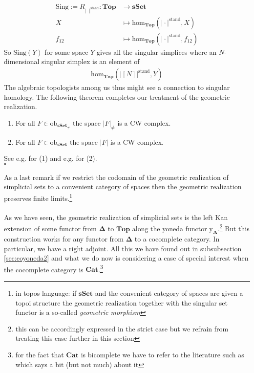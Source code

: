\begin{align*}
  \mathrm{Sing}
  :=
  R_{\vert \cdot \vert^{\textrm{stand}}}
  \colon
  \mathbf{Top}
  &\rightarrow
  \mathbf{sSet}
  \\
  X
  &\mapsto
  \mathrm{hom}_{\mathbf{Top}}
  \left(
    \vert
      \cdot
    \vert^{\textrm{stand}},
    X
  \right)
  \\
  f_{12}
  &\mapsto
  \mathrm{hom}_{\mathbf{Top}}
  \left(
    \vert
      \cdot
    \vert^{\textrm{stand}},
    f_{12}
  \right)
\end{align*}
So $\mathrm{Sing}(Y)$ for some space $Y$ gives all the singular simplices where an $N$-dimensional singular simplex is an element of
\begin{align*}
  \mathrm{hom}_{\mathbf{Top}}
  \left(
    \left\vert
      [N]
    \right\vert^{\textrm{stand}},
    Y
  \right)
\end{align*}
The algebraic topologists among us thus might see a connection to singular homology. The following theorem completes our treatment of the geometric realization.
\\
\begin{thm}
\label{thm:ssetcwcompex}
\begin{enumerate}
\item[(1)]
For all $F \in \mathrm{ob}_{\mathbf{sSet}_{\neq}}$ the space $\vert F \vert_{\neq}$ is a CW complex.
\item[(2)]
For all $F \in \mathrm{ob}_{\mathbf{sSet}}$ the space $\vert F \vert$ is a CW complex.
\end{enumerate}
\end{thm}
\begin{prf}
See e.g. \cite{8b5861fc} for (1) and e.g. \cite{b28b8d8f} for (2).
\\
\phantom{proven}
\hfill
$\square$
\end{prf}
As a last remark if we restrict the codomain of the geometric realization of simplicial sets to a convenient category of spaces then the geometric realization preserves finite limits.\footnote{in topos language: if $\mathbf{sSet}$ and the convenient category of spaces are given a topoi structure the geometric realization together with the singular set functor is a so-called \textit{geometric morphism}}
\\\\
As we have seen, the geometric realization of simplicial sets is the left Kan extension of some functor from $\mathbf{\Delta}$ to $\mathbf{Top}$ along the yoneda functor $\mathrm{y}_{\mathbf{\Delta}}$.\footnote{this can be accordingly expressed in the strict case but we refrain from treating this case further in this section} But this construction works for any functor from $\mathbf{\Delta}$ to a cocomplete category. In particular, we have a right adjoint. All this we have found out in subsubsection \ref{sec:coyoneda2} and what we do now is considering a case of special interest when the cocomplete category is $\mathbf{Cat}$.\footnote{for the fact that $\mathbf{Cat}$ is bicomplete we have to refer to the literature such as \cite{52fbba46} which says a bit (but not much) about it}
